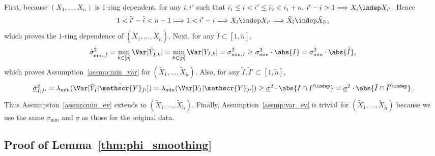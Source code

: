 \documentclass[aos]{imsart}
\begin{document}
\begin{appendix}
First, because $(X_1, \dots, X_n)$ is $1$-ring dependent, for any $i, i'$ such that $i_1 \leq i < i' \leq i_2 < i_1+n$, $i' - i > 1 \Longrightarrow X_{i} \indep X_{i'}$. Hence 
\begin{equation*}
    1 < \tilde{i}' - \tilde{i} < n-1 
    \Longrightarrow 1 < i' - i 
    \Longrightarrow X_i \indep X_{i'}
    \Longrightarrow \tilde{X}_{\tilde{i}} \indep \tilde{X}_{\tilde{i}'},
\end{equation*}
which proves the $1$-ring dependence of $(\tilde{X}_1, \dots, \tilde{X}_{\tilde{n}})$.
%
Next, for any $\tilde{I} \subset [1, \tilde{n}]$, 
\begin{equation*}
    \tilde{\sigma}^2_{\min, \tilde{I}} 
    = \min_{k \in [p]} \Var[\tilde{Y}_{\tilde{I}, k}]
    = \min_{k \in [p]} \Var[Y_{I,k}]
    = \sigma^2_{\min, I}
    \geq \sigma^2_{\min} \cdot \abs{I}
    = \sigma^2_{\min} \cdot \abs{\tilde{I}},
\end{equation*}
which proves Assumption~\eqref{assmp:min_var} for $(\tilde{X}_1, \dots, \tilde{X}_{\tilde{n}})$. Also, for any $\tilde{I}, \tilde{I}' \subset [1, \tilde{n}]$,
\begin{equation*}
    \underline{\tilde\sigma}^2_{\tilde{I} | \tilde{I}'} 
    = \lambda_{\min}(\Var[\tilde{Y}_{\tilde{I}} | \tilde{\mathscr{Y}}_{\tilde{I}'}])
    = \lambda_{\min}(\Var[Y_I | \mathscr{Y}_{I'}])
    \geq \underline{\sigma}^2 \cdot \abs{I \cap I'^{\indep}}
    = \underline{\sigma}^2 \cdot \abs{\tilde{I} \cap \tilde{I}'^{\indep}}.
\end{equation*}
Thus Assumption~\eqref{assmp:min_ev} extends to $(\tilde{X}_1, \dots, \tilde{X}_{\tilde{n}})$. Finally,
%
%
Assumption~\eqref{assmp:var_ev} is trivial for $(\tilde{X}_1, \dots, \tilde{X}_{\tilde{n}})$ because we use the same $\sigma_{\min}$ and $\underline{\sigma}$ as those for the original data. 





\subsection{Proof of Lemma~\ref{thm:phi_smoothing}} \label{sec:pf_phi_smoothing}


\end{appendix}
\end{document}
